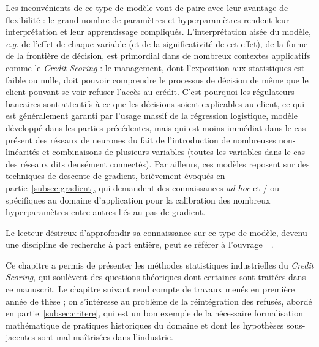 Les inconvénients de ce type de modèle vont de paire avec leur avantage de flexibilité : le grand nombre de paramètres et hyperparamètres rendent leur interprétation et leur apprentissage compliqués. L'interprétation aisée du modèle, \textit{e.g.} de l'effet de chaque variable (et de la significativité de cet effet), de la forme de la frontière de décision, est primordial dans de nombreux contextes applicatifs comme le \textit{Credit Scoring} : le management, dont l'exposition aux statistiques est faible ou nulle, doit pouvoir comprendre le processus de décision de même que le client pouvant se voir refuser l'accès au crédit. C'est pourquoi les régulateurs bancaires sont attentifs à ce que les décisions soient explicables au client, ce qui est généralement garanti par l'usage massif de la régression logistique, modèle développé dans les parties précédentes, mais qui est moins immédiat dans le cas présent des réseaux de neurones du fait de l'introduction de nombreuses non-linéarités et combinaisons de plusieurs variables (toutes les variables dans le cas des réseaux dits densément connectés). Par ailleurs, ces modèles reposent sur des techniques de descente de gradient, brièvement évoqués en partie~\ref{subsec:gradient}, qui demandent des connaissances \textit{ad hoc} et / ou spécifiques au domaine d'application pour la calibration des nombreux hyperparamètres entre autres liés au pas de gradient.

Le lecteur désireux d'approfondir sa connaissance sur ce type de modèle, devenu une discipline de recherche à part entière, peut se référer à l'ouvrage~~\cite{goodfellow2016deep}.

\bigskip

Ce chapitre a permis de présenter les méthodes statistiques industrielles du \textit{Credit Scoring}, qui soulèvent des questions théoriques dont certaines sont traitées dans ce manuscrit. Le chapitre suivant rend compte de travaux menés en première année de thèse ; on s'intéresse au problème de la réintégration des refusés, abordé en partie~\ref{subsec:critere}, qui est un bon exemple de la nécessaire formalisation mathématique de pratiques historiques du domaine et dont les hypothèses sous-jacentes sont mal maîtrisées dans l'industrie.

\printbibliography[heading=subbibliography, title=Références du chapitre 1]